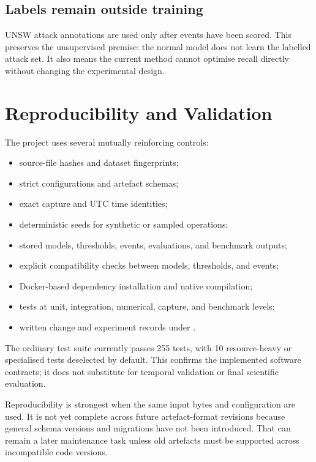 \documentclass[11pt,a4paper]{article}
\begin{document}
\subsection{Labels remain outside training}

UNSW attack annotations are used only after events have been scored. This preserves the unsupervised premise: the normal model does not learn the labelled attack set. It also means the current method cannot optimise recall directly without changing the experimental design.

\section{Reproducibility and Validation}

The project uses several mutually reinforcing controls:

\begin{itemize}
  \item source-file hashes and dataset fingerprints;
  \item strict configurations and artefact schemas;
  \item exact capture and UTC time identities;
  \item deterministic seeds for synthetic or sampled operations;
  \item stored models, thresholds, events, evaluations, and benchmark outputs;
  \item explicit compatibility checks between models, thresholds, and events;
  \item Docker-based dependency installation and native compilation;
  \item tests at unit, integration, numerical, capture, and benchmark levels;
  \item written change and experiment records under .
\end{itemize}

The ordinary test suite currently passes 255 tests, with 10 resource-heavy or specialised tests deselected by default. This confirms the implemented software contracts; it does not substitute for temporal validation or final scientific evaluation.

Reproducibility is strongest when the same input bytes and configuration are used. It is not yet complete across future artefact-format revisions because general schema versions and migrations have not been introduced. That can remain a later maintenance task unless old artefacts must be supported across incompatible code versions.
\end{document}
